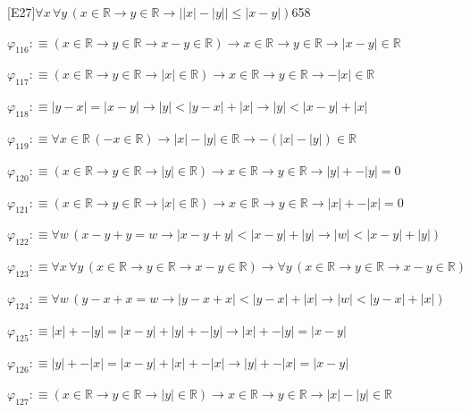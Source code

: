 \begin{fullproof}{[E27]}{$\forall x\,\forall y\,(x \in \mathbb{R} \to y \in \mathbb{R} \to \lvert \lvert x \rvert - \lvert y \rvert \rvert \leq \lvert x - y \rvert)$}{658}
\begin{abbrevlist}
\item $\varphi_{116} :\equiv (x \in \mathbb{R} \to y \in \mathbb{R} \to x - y \in \mathbb{R}) \to x \in \mathbb{R} \to y \in \mathbb{R} \to \lvert x - y \rvert \in \mathbb{R}$
\item $\varphi_{117} :\equiv (x \in \mathbb{R} \to y \in \mathbb{R} \to \lvert x \rvert \in \mathbb{R}) \to x \in \mathbb{R} \to y \in \mathbb{R} \to -\lvert x \rvert \in \mathbb{R}$
\item $\varphi_{118} :\equiv \lvert y - x \rvert = \lvert x - y \rvert \to \lvert y \rvert < \lvert y - x \rvert + \lvert x \rvert \to \lvert y \rvert < \lvert x - y \rvert + \lvert x \rvert$
\item $\varphi_{119} :\equiv \forall x \in \mathbb{R}\,(-x \in \mathbb{R}) \to \lvert x \rvert - \lvert y \rvert \in \mathbb{R} \to -(\lvert x \rvert - \lvert y \rvert) \in \mathbb{R}$
\item $\varphi_{120} :\equiv (x \in \mathbb{R} \to y \in \mathbb{R} \to \lvert y \rvert \in \mathbb{R}) \to x \in \mathbb{R} \to y \in \mathbb{R} \to \lvert y \rvert + -\lvert y \rvert = 0$
\item $\varphi_{121} :\equiv (x \in \mathbb{R} \to y \in \mathbb{R} \to \lvert x \rvert \in \mathbb{R}) \to x \in \mathbb{R} \to y \in \mathbb{R} \to \lvert x \rvert + -\lvert x \rvert = 0$
\item $\varphi_{122} :\equiv \forall w\,(x - y + y = w \to \lvert x - y + y \rvert < \lvert x - y \rvert + \lvert y \rvert \to \lvert w \rvert < \lvert x - y \rvert + \lvert y \rvert)$
\item $\varphi_{123} :\equiv \forall x\,\forall y\,(x \in \mathbb{R} \to y \in \mathbb{R} \to x - y \in \mathbb{R}) \to \forall y\,(x \in \mathbb{R} \to y \in \mathbb{R} \to x - y \in \mathbb{R})$
\item $\varphi_{124} :\equiv \forall w\,(y - x + x = w \to \lvert y - x + x \rvert < \lvert y - x \rvert + \lvert x \rvert \to \lvert w \rvert < \lvert y - x \rvert + \lvert x \rvert)$
\item $\varphi_{125} :\equiv \lvert x \rvert + -\lvert y \rvert = \lvert x - y \rvert + \lvert y \rvert + -\lvert y \rvert \to \lvert x \rvert + -\lvert y \rvert = \lvert x - y \rvert$
\item $\varphi_{126} :\equiv \lvert y \rvert + -\lvert x \rvert = \lvert x - y \rvert + \lvert x \rvert + -\lvert x \rvert \to \lvert y \rvert + -\lvert x \rvert = \lvert x - y \rvert$
\item $\varphi_{127} :\equiv (x \in \mathbb{R} \to y \in \mathbb{R} \to \lvert y \rvert \in \mathbb{R}) \to x \in \mathbb{R} \to y \in \mathbb{R} \to \lvert x \rvert - \lvert y \rvert \in \mathbb{R}$

\end{abbrevlist}
\end{fullproof}
